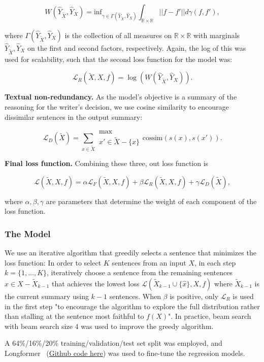\documentclass{article}
\begin{document}
\[
    W(\hat{Y}_{\tilde{X}}, \hat{Y}_X) = \text{inf}_{\gamma\in\Gamma (\hat{Y}_{\tilde{X}}, \hat{Y}_X)}\int_{\mathbb{R}\times\mathbb{R}}||f-f'||d\gamma (f,f'),
\]

where $\Gamma(\hat{Y}_{\tilde{X}}, \hat{Y}_X)$ is the collection of all measures on $\mathbb{R}\times\mathbb{R}$ with marginals $\hat{Y}_{\tilde{X}}, \hat{Y}_X$ on the first and second factors,
respectively. Again, the log of this was used for scalability, such that the second loss function for the model was:

\[
    \mathcal{L}_R (\tilde{X}, X, f) = \log{(W(\hat{Y}_{\tilde{X}}, \hat{Y}_X))}.
\]

\textbf{Textual non-redundancy.} As the model's objective is a summary of the reasoning for the writer's decision, we use cosine similarity to encourage dissimilar sentences in the output summary:

\[
    \mathcal{L}_D(\tilde{X}) = \sum_{x\in\tilde{X}}\substack{\text{max}\\ x'\in \tilde{X} - \{x\}} \text{cossim}(s(x), s(x')).
\]

\textbf{Final loss function.} Combining these three, out loss function is

\[
    \mathcal{L}(\tilde{X}, X, f) = \alpha\mathcal{L}_F (\tilde{X}, X, f) + \beta\mathcal{L}_R (\tilde{X}, X, f) + \gamma\mathcal{L}_D (\tilde{X}),
\]

where $\alpha, \beta, \gamma$ are parameters that determine the weight of each component of the loss function.

\subsubsection{The Model}
We use an iterative algorithm that greedily selects a sentence that minimizes the loss function: In order to select $K$ sentences from an input $X$, in each step $k=\{1, \dots, K\}$, iteratively
choose a sentence from the remaining sentences $\hat{x}\in X - \tilde{X}_{k-1}$ that achieves the lowest loss $\mathcal{L}(\tilde{X}_{k-1}\cup \{\hat{x}\}, X, f)$ where $\tilde{X}_{k-1}$ is the current
summary using $k-1$ sentences. When $\beta$ is positive, only $\mathcal{L}_R$ is used in the first step "to encourage the algorithm to explore the full distribution rather than stalling at the sentence
most faithful to $f(X)$". In practice, beam search with beam search size 4 was used to improve the greedy algorithm.

\pagebreak

A 64\%/16\%/20\% training/validation/test set split was employed, and Longformer~\cite{beltagy2020longformer} (\href{https://github.com/allenai/longformer}{Github code here}) was used to fine-tune the
regression models.
\end{document}
